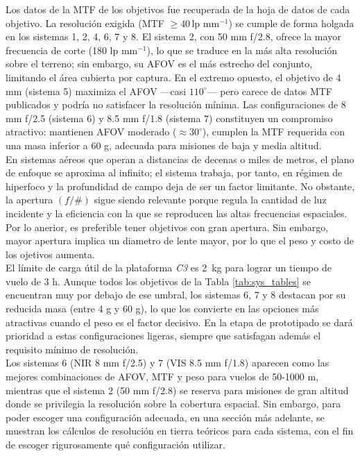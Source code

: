 \noindent Los datos de la MTF de los objetivos fue recuperada de la hoja de datos de cada objetivo. La resolución exigida (MTF $\geq40\,$lp mm\(^{-1}\)) se cumple de forma holgada en
los sistemas 1, 2, 4, 6, 7 y 8.  El sistema 2, con 50 mm f/2.8, ofrece la mayor
frecuencia de corte (180 lp mm\(^{-1}\)), lo que se traduce en la más alta
resolución sobre el terreno; sin embargo, su AFOV es el más estrecho del
conjunto, limitando el área cubierta por captura.  En el extremo opuesto, el
objetivo de 4 mm (sistema 5) maximiza el AFOV —casi \(110^{\circ}\)— pero carece de datos MTF publicados y podría no satisfacer la
resolución mínima.  Las configuraciones de 8 mm f/2.5 (sistema 6) y
8.5 mm f/1.8 (sistema 7) constituyen un compromiso atractivo: mantienen AFOV
moderado ($\approx30^{\circ}$), cumplen la MTF requerida con una masa inferior a 60 g, adecuada para misiones de baja y media
altitud.\\


\noindent En sistemas aéreos que operan a distancias de decenas o miles de metros, el plano de enfoque se aproxima al infinito; el sistema trabaja, por tanto, en régimen de hiperfoco y la profundidad de campo deja de ser un factor limitante.  No obstante, la apertura \((f/\#)\) sigue siendo relevante porque regula la cantidad de luz incidente y la eficiencia con la que se reproducen las altas frecuencias espaciales. Por lo anerior, es preferible tener objetivos con gran apertura. Sin embargo, mayor apertura implica un diametro de lente mayor, por lo que el peso y costo de los ojetivos aumenta. \\

\noindent El límite de carga útil de la plataforma \textit{C3} es 2 kg para lograr un tiempo de vuelo de 3 h. Aunque todos los objetivos de la Tabla \ref{tab:sys_tables} se encuentran muy por debajo de ese umbral, los sistemas 6, 7 y 8 destacan por su reducida masa (entre 4 g y 60 g), lo que los convierte en las opciones más atractivas cuando el peso es el factor decisivo. En la etapa de prototipado se dará prioridad a estas configuraciones ligeras, siempre que satisfagan además el requisito mínimo de resolución.\\


\noindent Los sistemas 6 (NIR 8 mm f/2.5) y 7 (VIS 8.5 mm f/1.8) aparecen como las mejores combinaciones de AFOV, MTF y peso para vuelos de 50-1000 m, mientras que el sistema 2 (50 mm f/2.8) se reserva para misiones de gran altitud donde se privilegia la resolución sobre la cobertura espacial. Sin embargo, para poder escoger una configuración adecuada, en una sección más adelante, se muestran los cálculos de resolución en tierra teóricos para cada sistema, con el fin de escoger rigurosamente qué configuración utilizar.



